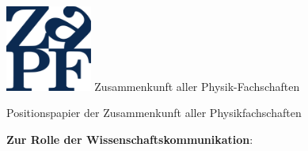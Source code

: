\documentclass[DIV=calc]{scrartcl}
\begin{document}
    \hspace{0.87\textwidth}
    \begin{minipage}{120pt}
        \vspace{-1.8cm}
        \includegraphics[width=80pt]{../../logo.pdf}
        \centering
        \small Zusammenkunft aller Physik-Fachschaften
    \end{minipage}
    \begin{center}
        \huge{Positionspapier der Zusammenkunft aller Physikfachschaften}\vspace{.25\baselineskip}\\
        \normalsize
    \end{center}
    \vspace{0cm}
\textbf{Zur Rolle der Wissenschaftskommunikation}:
\end{document}

